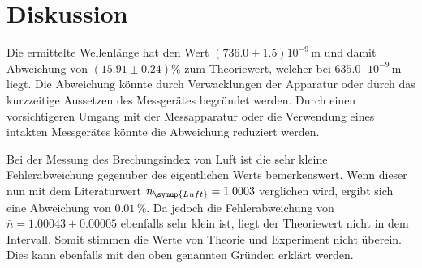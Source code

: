 \section{Diskussion}
\label{sec:Diskussion}

Die ermittelte Wellenlänge hat den Wert $(736.0 \pm 1.5)10^{-9}\, \unit{\meter}$ und damit Abweichung von $(15.91 \pm 0.24)\%$ zum Theoriewert, welcher bei $635.0\cdot 10^{-9}\, \unit{\meter}$ liegt.
Die Abweichung könnte durch Verwacklungen der Apparatur oder durch das kurzzeitige Aussetzen des Messgerätes begründet werden. 
Durch einen vorsichtigeren Umgang mit der Messapparatur oder die Verwendung eines intakten Messgerätes könnte die Abweichung reduziert werden.

Bei der Messung des Brechungsindex  von Luft ist die sehr kleine Fehlerabweichung gegenüber des eigentlichen Werts bemerkenswert. Wenn dieser nun 
mit dem Literaturwert $n_{\symup{Luft}} = 1.0003$ \cite{brechung} verglichen wird, ergibt sich eine Abweichung von $0.01\,\%$. 
Da jedoch die Fehlerabweichung von $\bar{n} = 1.00043 \pm 0.00005$ ebenfalls sehr klein ist, liegt der Theoriewert nicht in dem Intervall. Somit stimmen die 
Werte von Theorie und Experiment nicht überein. Dies kann ebenfalls mit den oben genannten Gründen erklärt werden.